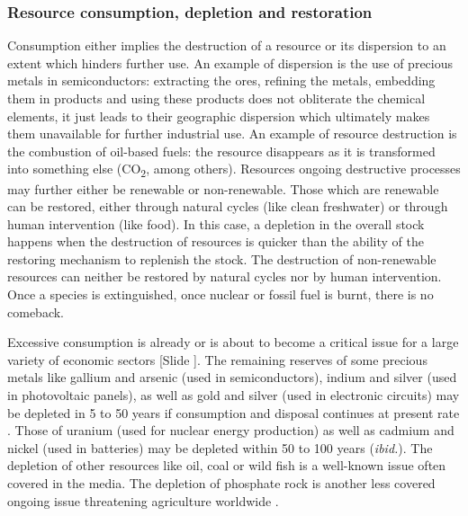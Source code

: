 \documentclass{article}
\newcounter{slide}
\begin{document}
\subsubsection{Resource consumption, depletion and restoration}
\label{sec:depletion}
Consumption either implies the destruction of a resource or its dispersion to an extent which hinders further use. An example of dispersion is the use of precious metals in semiconductors: extracting the ores, refining the metals, embedding them in products and using these products does not obliterate the chemical elements, it just leads to their geographic dispersion which ultimately makes them unavailable for further industrial use. An example of resource destruction is the combustion of oil-based fuels: the resource disappears as it is transformed into something else (CO\textsubscript{2}, among others). Resources ongoing destructive processes may further either be renewable or non-renewable. Those which are renewable can be restored, either through natural cycles (like clean freshwater) or through human intervention (like food). In this case, a depletion in the overall stock happens when the destruction of resources is quicker than the ability of the restoring mechanism to replenish the stock. The destruction of non-renewable resources can neither be restored by natural cycles nor by human intervention. Once a species is extinguished, once nuclear or fossil fuel is burnt, there is no comeback.

Excessive consumption is already or is about to become a critical issue for a large variety of economic sectors {\color{blue}[Slide ]}. The remaining reserves of some precious metals like gallium and arsenic (used in semiconductors), indium and silver (used in photovoltaic panels), as well as gold and silver (used in electronic circuits) may be depleted in 5 to 50 years if consumption and disposal continues at present rate \cite{dodsonElementalSustainabilityTotal2012}. Those of uranium (used for nuclear energy production) as well as cadmium and nickel (used in batteries) may be depleted within 50 to 100 years (\emph{ibid.}). The depletion of other resources like oil, coal or wild fish is a well-known issue often covered in the media. The depletion of phosphate rock is another less covered ongoing issue threatening agriculture worldwide \cite{cooperFutureDistributionProduction2011}.
\end{document}
